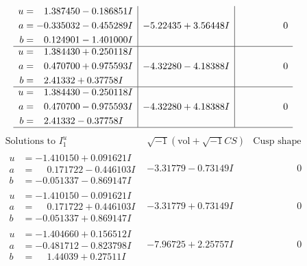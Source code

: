 \documentclass[1p]{elsarticle_modified}
\theoremstyle{definition}
\newcommand{\I}{\sqrt{-1}}
\begin{document}
$$\begin{array}{c|c|c}
\begin{aligned}
u &= \phantom{-}1.387450 - 0.186851 I \\
a &= -0.335032 - 0.455289 I \\
b &= \phantom{-}0.124901 - 1.401000 I\end{aligned}
 & -5.22435 + 3.56448 I & \phantom{-0.000000 } 0 \\ \hline\begin{aligned}
u &= \phantom{-}1.384430 + 0.250118 I \\
a &= \phantom{-}0.470700 + 0.975593 I \\
b &= \phantom{-}2.41332 + 0.37758 I\end{aligned}
 & -4.32280 - 4.18388 I & \phantom{-0.000000 } 0 \\ \hline\begin{aligned}
u &= \phantom{-}1.384430 - 0.250118 I \\
a &= \phantom{-}0.470700 - 0.975593 I \\
b &= \phantom{-}2.41332 - 0.37758 I\end{aligned}
 & -4.32280 + 4.18388 I & \phantom{-0.000000 } 0\\
 \hline 
 \end{array}$$\newpage$$\begin{array}{c|c|c}  
\text{Solutions to }I^u_{1}& \I (\text{vol} + \sqrt{-1}CS) & \text{Cusp shape}\\
 \hline 
\begin{aligned}
u &= -1.410150 + 0.091621 I \\
a &= \phantom{-}0.171722 - 0.446103 I \\
b &= -0.051337 - 0.869147 I\end{aligned}
 & -3.31779 - 0.73149 I & \phantom{-0.000000 } 0 \\ \hline\begin{aligned}
u &= -1.410150 - 0.091621 I \\
a &= \phantom{-}0.171722 + 0.446103 I \\
b &= -0.051337 + 0.869147 I\end{aligned}
 & -3.31779 + 0.73149 I & \phantom{-0.000000 } 0 \\ \hline\begin{aligned}
u &= -1.404660 + 0.156512 I \\
a &= -0.481712 - 0.823798 I \\
b &= \phantom{-}1.44039 + 0.27511 I\end{aligned}
 & -7.96725 + 2.25757 I & \phantom{-0.000000 } 0 \\ \hline\begin{aligned}

\end{aligned}
\end{array}$$
\end{document}
